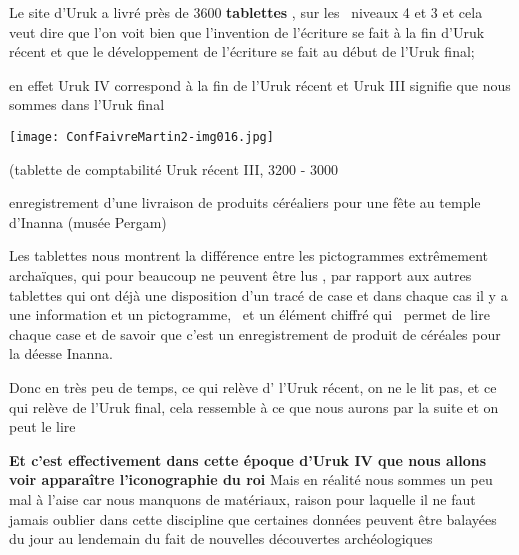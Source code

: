 \documentclass[a4paper]{article}
\begin{document}
\bigskip


\bigskip

{
Le site d'Uruk a livré près de 3600 \textbf{tablettes} , sur les \ niveaux 4 et 3 et cela veut dire que l'on voit bien
que l'invention de l'écriture se fait à la fin d'Uruk récent et que le développement de l'écriture se fait au début de
l'Uruk final;}

{
en effet Uruk IV correspond à la fin de l'Uruk récent et Uruk III signifie que nous sommes dans l'Uruk final}


\bigskip


\bigskip


\bigskip

 \texttt{[image: ConfFaivreMartin2-img016.jpg]} 


\bigskip

{
(tablette de comptabilité Uruk récent III, 3200 - 3000}

{
enregistrement d'une livraison de produits céréaliers pour une fête au temple d'Inanna (musée Pergam)}


\bigskip


\bigskip

{
Les tablettes nous montrent la différence entre les pictogrammes extrêmement archaïques, qui pour beaucoup ne peuvent
être lus , par rapport aux autres tablettes qui ont déjà une disposition d'un tracé de case et dans chaque cas il y a
une information et un pictogramme, \ et un élément chiffré qui \ permet de lire chaque case et de savoir que c'est un
enregistrement de produit de céréales pour la déesse Inanna.}


\bigskip

{
Donc en très peu de temps, ce qui relève d' l'Uruk récent, on ne le lit pas, et ce qui relève de l'Uruk final, cela
ressemble à ce que nous aurons par la suite et on peut le lire}


\bigskip


\bigskip


\bigskip


\bigskip


\bigskip


\bigskip


\bigskip


\bigskip


\bigskip

{
\textbf{Et c'est effectivement dans cette époque d'Uruk IV que nous allons voir apparaître l'iconographie du roi} Mais
en réalité nous sommes un peu mal à l'aise car nous manquons de matériaux, raison pour laquelle il ne faut jamais
oublier dans cette discipline que certaines données peuvent être balayées du jour au lendemain du fait de nouvelles
découvertes archéologiques}
\end{document}
